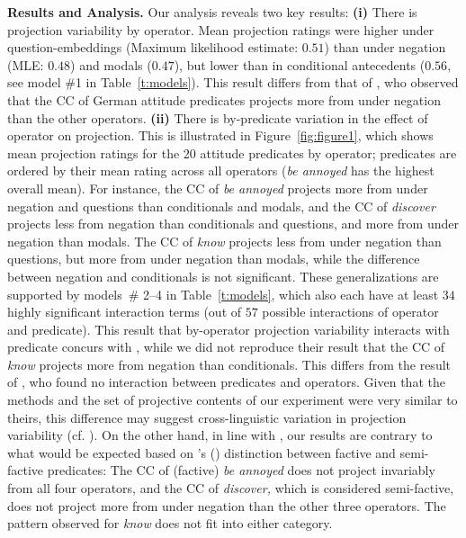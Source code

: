 \documentclass[12pt, a4paper]{article}
\newcommand{\posscite}[1]{\citeauthor{#1}'s (\citeyear{#1})}
\begin{document}
\noindent
{\bf Results and Analysis.}
	Our analysis reveals two key results: \textbf{(i)} There is projection variability by operator. Mean projection ratings were higher under question-embeddings (Maximum likelihood estimate: $0.51$) than under negation (MLE: $0.48$) and modals ($0.47$), but lower than in conditional antecedents ($0.56$, see model \#1 in Table\ \ref{t:models}).
	This result differs from that of \cite{sieker_projective_2022}, who observed that the CC of German attitude predicates projects more from under negation than the other operators.
	\textbf{(ii)} There is by-predicate variation in the effect of operator on projection. This is illustrated in Figure~\ref{fig:figure1}, which shows mean projection ratings for the 20 attitude predicates by operator; predicates are ordered by their mean rating across all operators (\emph{be annoyed} has the highest overall mean).
	For instance, the CC of \emph{be annoyed} projects more from under negation and questions than conditionals and modals, and the CC of \emph{discover} projects less from negation than conditionals and questions, and more from under negation than modals. The CC of \emph{know} projects less from under negation than questions, but more from under negation than modals, while the difference between negation and conditionals is not significant.
	These generalizations are supported by models\ \# 2--4 in Table\ \ref{t:models}, which also each have at least $34$ highly significant interaction terms (out of $57$ possible interactions of operator and predicate).
	This result that by-operator projection variability interacts with predicate concurs with \citet{smith_relationship_2014}, while we did not reproduce their result that the CC of \emph{know} projects more from negation than conditionals. This differs from the result of \citet{sieker_projective_2022}, who found no interaction between predicates and operators.
	Given that the methods and the set of projective contents of our experiment were very similar to theirs, this difference may suggest cross-linguistic variation in projection variability (cf. \citealt{tonhauser_projection_2020}).
	On the other hand, in line with \citet{sieker_projective_2022}, our results are contrary to what would be expected based on \posscite{karttunen_observations_1971} distinction between factive and semi-factive predicates: The CC of (factive) \emph{be annoyed} does not project invariably from all four operators, and the CC of \emph{discover,}  which is considered semi-factive, does not project more from under negation than the other three operators. The pattern observed for {\em know} does not fit into either category.
	
\end{document}
